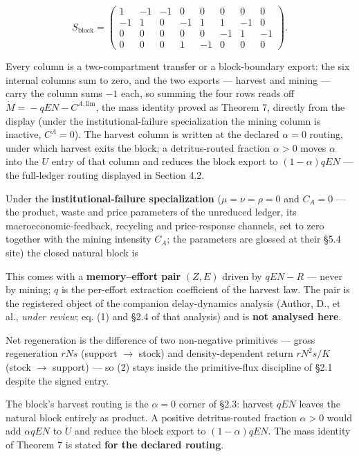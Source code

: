 \documentclass[11pt]{article}
\begin{document}
$$S_{\mathrm{block}} = \begin{pmatrix} 1 & -1 & -1 & 0 & 0 & 0 & 0 & 0 \\ -1 & 1 & 0 & -1 & 1 & 1 & -1 & 0 \\ 0 & 0 & 0 & 0 & 0 & -1 & 1 & -1 \\ 0 & 0 & 0 & 1 & -1 & 0 & 0 & 0 \end{pmatrix}.$$

 Every column is a two-compartment transfer or a block-boundary export: the six internal columns sum to zero, and the two exports --- harvest and mining --- carry the column sums \(-1\) each, so summing the four rows reads off \(\dot M =\allowbreak{} -qEN - C^{A,\allowbreak{}\mathrm{lim}}\), the mass identity proved as Theorem 7, directly from the display (under the institutional-failure specialization the mining column is inactive, \(C^A = 0\)). The harvest column is written at the declared \(\alpha = 0\) routing, under which harvest exits the block; a detritus-routed fraction \(\alpha > 0\) moves \(\alpha\) into the \(U\) entry of that column and reduces the block export to \((1-\alpha)qEN\) --- the full-ledger routing displayed in Section 4.2.

Under the \textbf{institutional-failure specialization} (\(\mu=\nu=\rho=0\) and \(C_A=0\) --- the product, waste and price parameters of the unreduced ledger, its macroeconomic-feedback, recycling and price-response channels, set to zero together with the mining intensity \(C_A\); the parameters are glossed at their \S5.4 site) the closed natural block is

This comes with a \textbf{memory--effort pair} \((Z,E)\) driven by \(qEN-R\) --- never by mining; \(q\) is the per-effort extraction coefficient of the harvest law. The pair is the registered object of the companion delay-dynamics analysis (Author, D., et al., \emph{under review}; eq. (1) and \S2.4 of that analysis) and is \textbf{not analysed here}.

Net regeneration is the difference of two non-negative primitives --- gross regeneration \(rNs\) (support \(\to\) stock) and density-dependent return \(rN^2s/\allowbreak{}K\) (stock \(\to\) support) --- so (2) stays inside the primitive-flux discipline of \S2.1 despite the signed entry.

The block's harvest routing is the \(\alpha=0\) corner of \S2.3: harvest \(qEN\) leaves the natural block entirely as product. A positive detritus-routed fraction \(\alpha>0\) would add \(\alpha qEN\) to \(\dot U\) and reduce the block export to \((1-\alpha)qEN\). The mass identity of Theorem 7 is stated \textbf{for the declared routing}.
\end{document}
